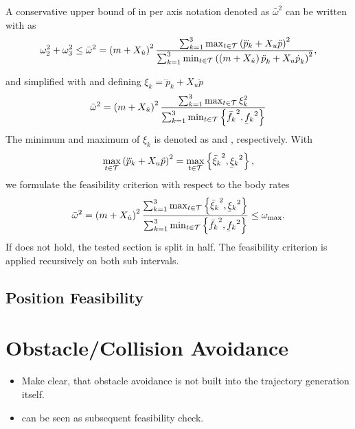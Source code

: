 A conservative upper bound of  in per axis notation denoted as $\bar{\omega}^2$ can be written with  as
\begin{equation}
	\omega_2^2 + \omega_3^2
	\leq
	\bar{\omega}^2
	=
	\left(
		m + X_{\dot{u}}
	\right)^2
	\frac{
		\sum_{k=1}^{3}
		\max_{t \in \mathcal{T}}
		\left(
			\dddot{p}_k + X_u \ddot{p}
		\right)^2
	}{
		\sum_{k=1}^{3}
		\min_{t \in \mathcal{T}}
		\left(
			\left(m + X_{\dot{u}}\right)\mbox{$\ddot{p}$}_k
			+ X_u \mbox{$\dot{p}$}_k
		\right)^2
	}
	,
\end{equation}

and simplified with  and defining $\xi_k = \dddot{p}_k + X_u \ddot{p}$
\begin{equation}
	\bar{\omega}^2 =
	\left(
		m + X_{\dot{u}}
	\right)^2
	\frac{
		\sum_{k=1}^{3}
		\max_{t \in \mathcal{T}}
		\xi_k^2
	}{
		\sum_{k=1}^{3}
		\min_{t \in \mathcal{T}}
		\left\{\fmaxaxis^2, \fminaxis^2\right\}
	}
\end{equation}
The minimum and maximum of $\xi_k$ is denoted as \ximaxaxis and \ximinaxis, respectively. With
\begin{equation}
	\max_{t \in \mathcal{T}}
	\left(
		\dddot{p}_k + X_u \ddot{p}
	\right)^2 =
	\max_{t \in \mathcal{T}}
	\left\{
		\ximaxaxis^2, \ximinaxis^2
	\right\}
	,
\end{equation}
we formulate the feasibility criterion with respect to the body rates
\begin{equation}
	\label{eq:body-rates-criterion-per-axis}
	\bar{\omega}^2
	=
	\left(
		m + X_{\dot{u}}
	\right)^2
	\frac{
		\sum_{k=1}^{3}
		\max_{t \in \mathcal{T}}
		\left\{
			\ximaxaxis^2, \ximinaxis^2
		\right\}
	}{
		\sum_{k=1}^{3}
		\min_{t \in \mathcal{T}}
		\left\{\fmaxaxis^2, \fminaxis^2\right\}
	}
	\leq
	\omegamax
	.
\end{equation}
If  does not hold, the tested section is split in half. The feasibility criterion is applied recursively on both sub intervals.


\subsection{Position Feasibility}

\section{Obstacle/Collision Avoidance}
\begin{itemize}
	\color{red}
	\item Make clear, that obstacle avoidance is not built into the trajectory generation itself. 
	\item can be seen as subsequent feasibility check. 
\end{itemize}

